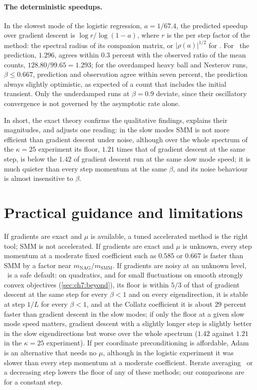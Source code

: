 \paragraph{The deterministic speedups.} In the slowest mode of the logistic
regression, $a=1/67.4$, the predicted speedup over gradient descent is
$\log r/\log(1-a)$, where $r$ is the per step factor of the method: the spectral
radius of its companion matrix, or $|\rho(a)|^{1/2}$ for \smmdet.
For \smmdet\ the prediction, $1.296$, agrees within $0.3$ percent with the observed ratio of the mean counts, $128.80/99.65=1.293$; for the overdamped heavy ball and Nesterov runs, $\beta\le0.667$, prediction and observation agree within seven percent, the prediction always
slightly optimistic, as expected of a count that includes the initial
transient. Only the underdamped runs at $\beta=0.9$ deviate, since their
oscillatory convergence is not governed by the asymptotic rate alone.

In short, the exact theory confirms the qualitative findings, explains their magnitudes, and adjusts one reading: in the slow modes SMM is not more efficient than gradient descent under noise, although over the whole spectrum of the $\kappa=25$ experiment its floor, $1.21$ times that of gradient descent at the same step, is below the $1.42$ of gradient descent run at the same slow mode speed; it is much quieter than every step momentum at the same $\beta$, and its noise behaviour is almost insensitive to $\beta$.

\section{Practical guidance and limitations}\label{sec:ch7:guidance}

If gradients are exact and $\mu$ is available, a tuned accelerated method is
the right tool; SMM is not accelerated. If gradients are exact and $\mu$ is
unknown, every step momentum at a moderate fixed coefficient such as $0.585$ or
$0.667$ is faster than SMM by a factor near $m_{\mathrm{NAG}}/m_{\mathrm{SMM}}$.
If gradients are noisy at an unknown level, \smmdet\ is a safe default: on quadratics, and for small fluctuations on smooth strongly convex objectives (\cref{sec:ch7:beyond}), its
floor is within $5/3$ of that of gradient descent at the same step for every
$\beta<1$ and on every eigendirection, it is stable at step $1/L$ for every
$\beta<1$, and at the Collatz coefficient it is about $29$ percent faster than
gradient descent in the slow modes; if only the floor at a given slow mode speed matters, gradient descent with a slightly longer step is slightly better in the slow eigendirections but worse over the whole spectrum ($1.42$ against $1.21$ in the $\kappa=25$ experiment).
If per coordinate preconditioning is affordable, Adam is an alternative that needs no $\mu$, although in the logistic experiment it was slower than every step momentum at a moderate coefficient. Iterate
averaging~\cite{polyak1992} or a decreasing step lowers the floor of any of
these methods; our comparisons are for a constant step.

